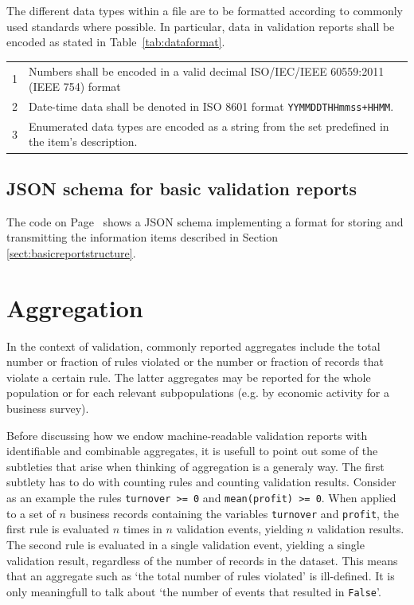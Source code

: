 \documentclass[a4paper, 11pt,titlepage]{article}
\newcommand{\code}[1]{\texttt{#1}}
\newcommand{\onwaar}{{\normalfont \texttt{False}}}
\begin{document}
The different data types within a file are to be formatted according to
commonly used standards where possible. In particular, data in validation
reports shall be encoded as stated in Table~\ref{tab:dataformat}.
\begin{center}
\begin{tabular}{|lp{}|}
\hline
1&Numbers shall be encoded in a valid decimal ISO/IEC/IEEE 60559:2011 (IEEE 754) format \\
2&Date-time data shall be denoted in ISO 8601 format \code{YYMMDDTHHmmss+HHMM}. \\
3&Enumerated data types are encoded as a string from the set predefined in the item's description.\\
\hline
\end{tabular}
\label{tab:dataformat}
\end{center}



\subsection{JSON schema for basic validation reports}
The code on Page~\pageref{code:basicreport} shows a JSON schema implementing a
format for storing and transmitting the information items described in Section
\ref{sect:basicreportstructure}.





\newpage
\label{code:basicreport}


\section{Aggregation}
In the context of validation, commonly reported aggregates include the total
number or fraction of rules violated or the number or fraction of records  that
violate a certain rule. The latter aggregates may be reported for the whole
population or for each relevant subpopulations (e.g. by economic activity for a
business survey). 


Before discussing how we endow machine-readable validation reports with
identifiable and combinable aggregates, it is usefull to point out some of the
subtleties that arise when thinking of aggregation is a generaly way. The first
subtlety has to do with counting rules and counting validation results.
Consider as an example the rules \code{turnover >= 0} and \code{mean(profit) >=
0}.  When applied to a set of $n$ business records containing the variables
\code{turnover} and \code{profit}, the first rule is evaluated $n$ times in $n$
validation events, yielding $n$ validation results. The second rule is
evaluated in a single validation event, yielding a single validation result,
regardless of the number of records in the dataset. This means that an
aggregate such as `the total number of rules violated' is ill-defined. It is
only meaningfull to talk about `the number of events that resulted in
\onwaar{}'. 
\end{document}
